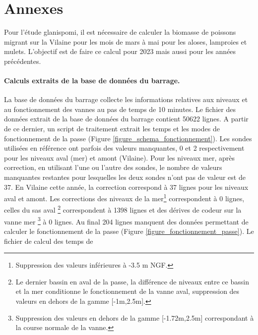 \documentclass[11pt,twocolumn,titlepage,twoside]{article}\usepackage[]{graphicx}\usepackage[]{color}
\begin{document}
\clearpage
\onecolumn
\section{Annexes}

Pour l'étude glanispomi, il est nécessaire de calculer la biomasse de poissons
migrant sur la Vilaine pour les mois de mars à mai pour les aloses, lamproies et
mulets. L'objectif est de faire ce calcul pour 2023 mais aussi pour les années
précédentes.




\paragraph{Calculs extraits de la base de données du barrage.}

La base de données du barrage collecte les informations relatives aux niveaux et
au fonctionnement des vannes au pas de temps de 10 minutes. Le fichier des données extrait de la base de données du barrage
contient \textcolor{orange_EV}{\num{50622}} lignes. A partir de ce dernier,
un script de traitement extrait les temps et les modes de fonctionnement de la
passe (Figure \ref{figure_schema_fonctionnement}). 
Les sondes utilisées en
référence ont parfois des valeurs manquantes,
 \textcolor{orange_EV}{\num{0}} et \textcolor{orange_EV}{\num{2}} respectivement 
 pour les niveaux aval (mer) et amont (Vilaine).
Pour les niveaux mer, après correction, en utilisant l'une ou l'autre des
sondes, le nombre de valeurs manquantes restantes pour lesquelles les deux sondes n'ont pas de
valeur est de \textcolor{orange_EV}{\num{37}}. En Vilaine
cette année, la correction correspond à
\textcolor{orange_EV}{\num{37}} lignes pour les
niveaux aval et amont.
Les corrections des niveaux de la mer\footnote{Suppression
des valeurs inférieures à -3.5 m NGF.} correspondent à
\textcolor{orange_EV}{\num{0}} lignes, celles du sas aval \footnote{Le dernier
bassin en aval de la passe, la différence de niveaux entre ce bassin et la mer conditionne le
fonctionnement de la vanne aval, suppression des valeurs en dehors de la gamme
[-1m,2.5m].} correspondent à \textcolor{orange_EV}{\num{1398}} lignes et des
dérives de codeur sur la vanne mer \footnote{Suppression des valeurs en dehors de la gamme
[-1.72m,2.5m] correspondant à la course normale de la vanne.} à
\textcolor{orange_EV}{\num{0}} lignes. 
Au final \textcolor{orange_EV}{\num{204}} lignes manquent des données permettant de
calculer le fonctionnement de la passe (Figure \ref{figure_fonctionnement_passe}). Le fichier de calcul des temps de
\end{document}
